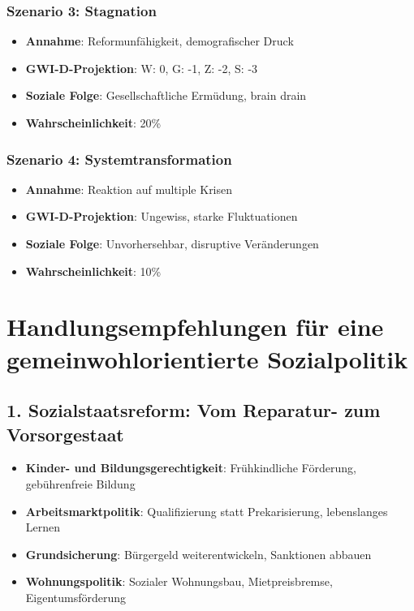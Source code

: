 \subsubsection{Szenario 3: Stagnation}

\begin{itemize}
    \item \textbf{Annahme}: Reformunfähigkeit, demografischer Druck
    \item \textbf{GWI-D-Projektion}: W: 0, G: -1, Z: -2, S: -3
    \item \textbf{Soziale Folge}: Gesellschaftliche Ermüdung, brain drain
    \item \textbf{Wahrscheinlichkeit}: 20\%
\end{itemize}

\subsubsection{Szenario 4: Systemtransformation}

\begin{itemize}
    \item \textbf{Annahme}: Reaktion auf multiple Krisen
    \item \textbf{GWI-D-Projektion}: Ungewiss, starke Fluktuationen
    \item \textbf{Soziale Folge}: Unvorhersehbar, disruptive Veränderungen
    \item \textbf{Wahrscheinlichkeit}: 10\%
\end{itemize}

\section{Handlungsempfehlungen für eine gemeinwohlorientierte Sozialpolitik}

\subsection{1. Sozialstaatsreform: Vom Reparatur- zum Vorsorgestaat}

\begin{itemize}
    \item \textbf{Kinder- und Bildungsgerechtigkeit}: Frühkindliche Förderung, gebührenfreie Bildung
    \item \textbf{Arbeitsmarktpolitik}: Qualifizierung statt Prekarisierung, lebenslanges Lernen
    \item \textbf{Grundsicherung}: Bürgergeld weiterentwickeln, Sanktionen abbauen
    \item \textbf{Wohnungspolitik}: Sozialer Wohnungsbau, Mietpreisbremse, Eigentumsförderung
\end{itemize}

